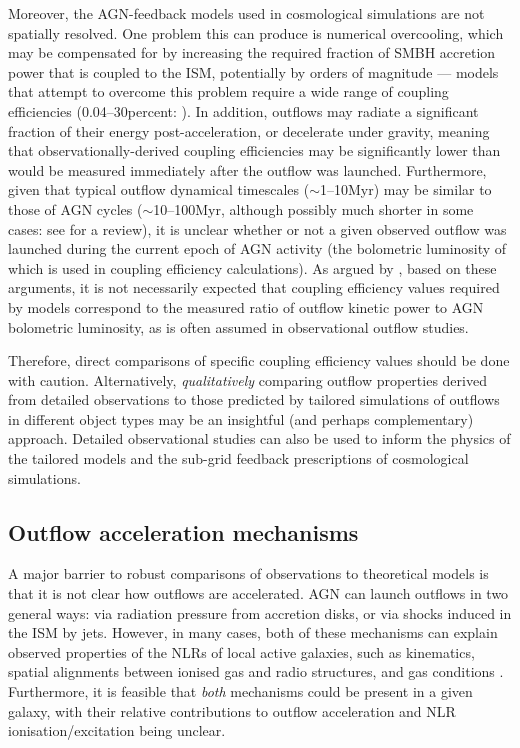 Moreover, the AGN-feedback models used in cosmological simulations are not spatially resolved. One problem this can produce is numerical overcooling, which may be compensated for by increasing the required fraction of SMBH accretion power that is coupled to the ISM, potentially by orders of magnitude \citep{Weinberger2017} --- models that attempt to overcome this problem require a wide range of coupling efficiencies (0.04--30\;per\;cent: \citealt{Booth2009, Choi2012}). In addition, outflows may radiate a significant fraction of their energy post-acceleration, or decelerate under gravity, meaning that observationally-derived coupling efficiencies may be significantly lower than would be measured immediately after the outflow was launched. Furthermore, given that typical outflow dynamical timescales ($\sim$1--10\;Myr) may be similar to those of AGN cycles ($\sim$10--100\;Myr, although possibly much shorter in some cases: see \citealt{Morganti2017} for a review), it is unclear whether or not a given observed outflow was launched during the current epoch of AGN activity (the bolometric luminosity of which is used in coupling efficiency calculations). As argued by \citet{Harrison2018}, based on these arguments, it is not necessarily expected that coupling efficiency values required by models correspond to the measured ratio of outflow kinetic power to AGN bolometric luminosity, as is often assumed in observational outflow studies.

Therefore, direct comparisons of specific coupling efficiency values should be done with caution. Alternatively, \textit{qualitatively} comparing outflow properties derived from detailed observations to those predicted by tailored simulations of outflows in different object types may be an insightful (and perhaps complementary) approach. Detailed observational studies can also be used to inform the physics of the tailored models and the sub-grid feedback prescriptions of cosmological simulations.


\subsection{Outflow acceleration mechanisms}
\label{section: introduction: outflows: acceleration_mechanisms}

A major barrier to robust comparisons of observations to theoretical models is that it is not clear how outflows are accelerated. AGN can launch outflows in two general ways: via radiation pressure from accretion disks, or via shocks induced in the ISM by jets. However, in many cases, both of these mechanisms can explain observed properties of the NLRs of local active galaxies, such as kinematics, spatial alignments between ionised gas and radio structures, and gas conditions \citep{Ulvestad1981, Wilson1985, Whittle1988, Cecil1990, Capetti1995a, Capetti1995b, Axon1998, Crenshaw2000_N1068, Crenshaw2000_N4151, Das2005, Das2006, Mukherjee2016, Mukherjee2018, Meena2021}. Furthermore, it is feasible that \textit{both} mechanisms could be present in a given galaxy, with their relative contributions to outflow acceleration and NLR ionisation/excitation being unclear.

